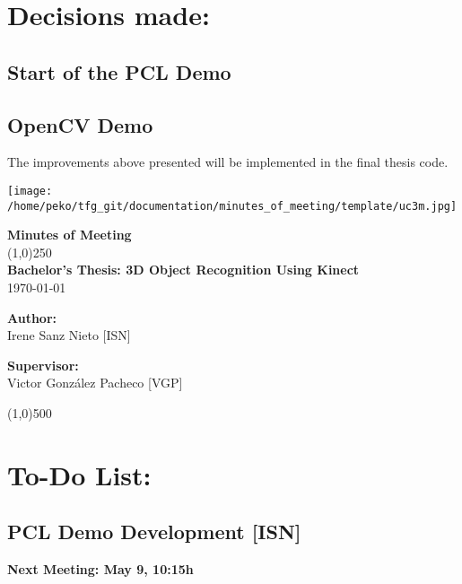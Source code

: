 \documentclass{article}
\newenvironment{myindentpar}[1]%
 {\begin{list}{}%
         {\setlength{\leftmargin}{#1}}%
         \item[]%
 }
 {\end{list}}
\begin{document}
\section{\LARGE Decisions made:}
	\subsection{Start of the PCL Demo}
	\subsection{OpenCV Demo}
		\begin{myindentpar}{1cm} 
		The improvements above presented will be implemented in the final thesis code. 
		\end{myindentpar}


\texttt{[image: /home/peko/tfg\_git/documentation/minutes\_of\_meeting/template/uc3m.jpg]}

\vspace{-1cm}
\begin{minipage}[b]{1\linewidth}
	\begin{center}
	{\Huge \bfseries{Minutes of Meeting}}\\
	\line(1,0){250}\\[1cm]
	{\LARGE \textbf{Bachelor's Thesis: 3D Object Recognition Using Kinect}}\\[0.5cm]
	{\large \today}
	\end{center}
\end {minipage}



\begin{minipage}{0.55\textwidth}
\begin{flushleft} \large
\textbf{{Author:}\\}
Irene Sanz Nieto [ISN]\\
\end{flushleft}
\end{minipage}
\begin{minipage}{0.4\textwidth}
\begin{flushright} \large
\textbf{Supervisor: }\\
Victor González Pacheco [VGP]
\end{flushright}\end{minipage}

\begin{center}
\line(1,0){500}
\end{center}
\section{\LARGE To-Do List: }
	\subsection{PCL Demo Development [ISN]}
	

	


\begin {center}
{\Large \textbf{Next Meeting: May 9, 10:15h}}
\end{center}
\end{document}
